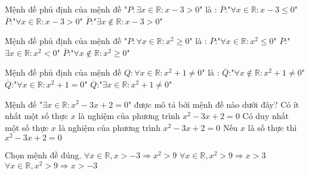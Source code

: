 \begin{ex}%
	Mệnh đề phủ định của mệnh đề "$P: \exists x\in\mathbb{R}:x-3>0$" là : 
	{\True $\overline{P}$:"$\forall x\in\mathbb{R}:x-3\leq 0$"}
	{$\overline{P}$:"$\forall x\in\mathbb{R}:x-3>0$"}
	{$\overline{P}$:"$\exists x\notin\mathbb{R}:x-3>0$"}
\end{ex}
\begin{ex}%
	Mệnh đề phủ định của mệnh đề "$P: \forall x\in\mathbb{R}:x^2\geq 0$" là : 
	{$\overline{P}$:"$\forall x\in\mathbb{R}:x^2\leq 0$"}
	{\True $\overline{P}$:"$\exists x\in\mathbb{R}:x^2<0$"}
	{$\overline{P}$:"$\forall x\notin\mathbb{R}:x^2\geq 0$"}
\end{ex}
\begin{ex}%
	Mệnh đề phủ định của mệnh đề $Q: \forall x\in\mathbb{R}: x^2+1\neq 0$" là : 
	{$\overline{Q}$:"$\forall x\notin\mathbb{R}:x^2+1\neq 0$"}
	{$\overline{Q}$:"$\forall x\in\mathbb{R}:x^2+1=0$"}
	{$\overline{Q}$:"$\exists x\in\mathbb{R}:x^2+1\neq 0$"}
\end{ex}
\begin{ex}%
	Mệnh đề "$\exists x\in\mathbb{R}: x^2-3x+2=0$" được mô tả bởi mệnh đề nào dưới đây?
	{\True Có ít nhất một số thực $x$ là nghiệm của phương trình $x^2-3x+2=0$}
	{Có duy nhất một số thực $x$ là nghiệm của phương trình $x^2-3x+2=0$}
	{Nếu $x$ là số thực thì $x^2-3x+2=0$}
\end{ex}
\begin{ex}%
	Chọn mệnh đề đúng.
	{$\forall x\in\mathbb{R}, x>-3\Rightarrow x^2>9$}
	{$\forall x\in\mathbb{R}, x^2>9\Rightarrow x>3$}
	{$\forall x\in\mathbb{R}, x^2>9\Rightarrow x>-3$}
\end{ex}
